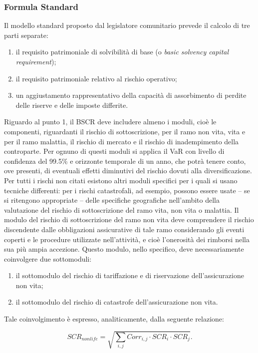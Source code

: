 \subsubsection{Formula Standard}
Il modello standard proposto dal legislatore comunitario prevede il calcolo di tre parti separate:
\begin{enumerate}
\item il requisito patrimoniale di solvibilità di base (o {\itshape basic solvency capital requirement});
\item il requisito patrimoniale relativo al rischio operativo;
\item un aggiustamento rappresentativo della capacità di assorbimento di perdite delle riserve e delle imposte differite.
\end{enumerate}
Riguardo al punto 1, il BSCR deve includere almeno i moduli, cioè le componenti, riguardanti il rischio di sottoscrizione, per il ramo non vita, vita e per il ramo malattia, il rischio di mercato e il rischio di inadempimento della controparte. Per ognuno di questi moduli si applica il VaR con livello di confidenza del 99.5\% e orizzonte temporale di un anno, che potrà tenere conto, ove presenti, di eventuali effetti diminutivi del rischio dovuti alla diversificazione.
Per tutti i rischi non citati esistono altri moduli specifici per i quali si usano tecniche differenti: per i rischi catastrofali, ad esempio, possono essere usate – se si ritengono appropriate – delle specifiche geografiche nell’ambito della valutazione del rischio di sottoscrizione del ramo vita, non vita o malattia.
Il modulo del rischio di sottoscrizione del ramo non vita deve comprendere il rischio discendente dalle obbligazioni assicurative di tale ramo considerando gli eventi coperti e le procedure utilizzate nell’attività, e cioè l’onerosità dei rimborsi nella sua più ampia accezione.
Questo modulo, nello specifico, deve necessariamente coinvolgere due sottomoduli:
\begin{enumerate}
\item il sottomodulo del rischio di tariffazione e di riservazione dell’assicurazione non vita;
\item il sottomodulo del rischio di catastrofe dell’assicurazione non vita.
\end{enumerate}
Tale coinvolgimento è espresso, analiticamente, dalla seguente relazione:

\begin{equation}
SCR_{non life} = \sqrt{\sum_{i,j}Corr_{i,j} \cdot SCR_{i} \cdot SCR_{j}}.
\label{for:scrnonlife}
\end{equation}

